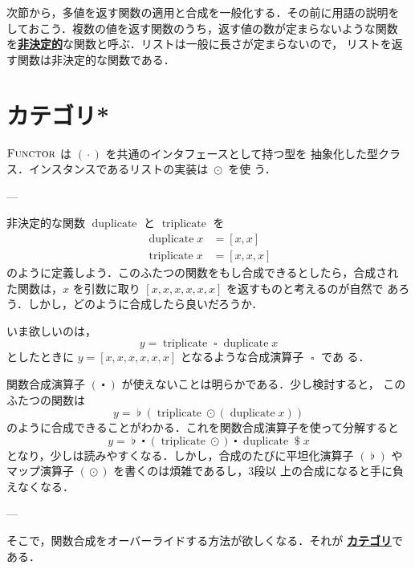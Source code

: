 \documentclass[a5paper,twoside,fleqn,draft]{jsbook}
\newcommand{\TK}[1]{\mask{\textbf{TK:}~#1}{C}}
\newcommand{\keyword}[1]{{\underline{\textbf{#1}}}}
\newcommand{\mSpecialFunc}[1]{#1}
\DeclareMathOperator{\mDuplicate}{\mSpecialFunc{duplicate}}
\DeclareMathOperator{\mTriplicate}{\mSpecialFunc{triplicate}}
\DeclareMathOperator{\mApply}{\$}
\DeclareMathOperator{\mComp}{\centerdot}
\DeclareMathOperator{\mJoinList}{\flat} %
\DeclareMathOperator{\mMap}{\cdot}
\DeclareMathOperator{\mMapList}{\odot}
\DeclareMathOperator{\mSomeOp}{\square}
\newcommand{\mTypeClass}[1]{\textsc{#1}} %
\newcommand{\mFunctorTypeClass}{\mTypeClass{Functor}}
\begin{document}
次節から，多値を返す関数の適用と合成を一般化する．その前に用語の説明を
しておこう．複数の値を返す関数のうち，返す値の数が定まらないような関数
を\keyword{非決定的}な関数と呼ぶ．リストは一般に長さが定まらないので，
リストを返す関数は非決定的な関数である．


\section{カテゴリ*}

\TK{Writing.}

$\mFunctorTypeClass$ は $(\mMap)$ を共通のインタフェースとして持つ型を
抽象化した型クラス．インスタンスであるリストの実装は $\mMapList$ を使
う．

---

非決定的な関数 $\mDuplicate$ と $\mTriplicate$ を
\begin{align}
  \mDuplicate x
  &=[x,x]\\
  \mTriplicate x
  &=[x,x,x]
\end{align}
のように定義しよう．このふたつの関数をもし合成できるとしたら，合成され
た関数は，$x$ を引数に取り $[x,x,x,x,x,x]$ を返すものと考えるのが自然で
あろう．しかし，どのように合成したら良いだろうか．

いま欲しいのは，
\begin{equation}
  y
  =\mTriplicate\mSomeOp\mDuplicate x
\end{equation}
としたときに $y=[x,x,x,x,x,x]$ となるような合成演算子 $\mSomeOp$ であ
る．

関数合成演算子 $(\mComp)$ が使えないことは明らかである．少し検討すると，
このふたつの関数は
\begin{equation}
  y
  =\mJoinList(\mTriplicate\mMapList(\mDuplicate x))
\end{equation}
のように合成できることがわかる．これを関数合成演算子を使って分解すると
\begin{equation}
  \label{eq:triplicate-duplicate}
  y
  =\mJoinList\mComp(\mTriplicate\mMapList)\mComp\mDuplicate\mApply x
\end{equation}
となり，少しは読みやすくなる．しかし，合成のたびに平坦化演算子
$(\mJoinList)$ やマップ演算子 $(\mMapList)$ を書くのは煩雑であるし，3段以
上の合成になると手に負えなくなる．

---

そこで，関数合成をオーバーライドする方法が欲しくなる．それが
\keyword{カテゴリ}である．
\end{document}
